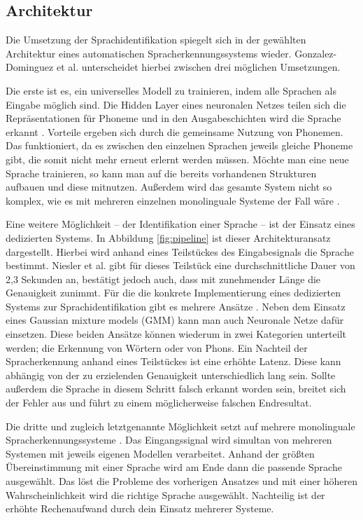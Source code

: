 \subsection{Architektur}
Die Umsetzung der Sprachidentifikation spiegelt sich in der gewählten Architektur eines automatischen Spracherkennungssystems wieder. Gonzalez-Dominguez et al. \cite{Gonzalez.2015} unterscheidet hierbei zwischen drei möglichen Umsetzungen.

Die erste ist es, ein universelles Modell zu trainieren, indem alle Sprachen als Eingabe möglich sind. Die Hidden Layer eines neuronalen Netzes teilen sich die Repräsentationen für Phoneme und in den Ausgabeschichten wird die Sprache erkannt \cite{Yu.2014}.
Vorteile ergeben sich durch die gemeinsame Nutzung von Phonemen. Das funktioniert, da es zwischen den einzelnen Sprachen jeweils gleiche Phoneme gibt, die somit nicht mehr erneut erlernt werden müssen.
Möchte man eine neue Sprache trainieren, so kann man auf die bereits vorhandenen Strukturen aufbauen und diese mitnutzen.
Außerdem wird das gesamte System nicht so komplex, wie es mit mehreren einzelnen monolinguale Systeme der Fall wäre \cite{Bartz.2017}.

Eine weitere Möglichkeit – der Identifikation einer Sprache – ist der Einsatz eines dedizierten Systems. In Abbildung \ref{fig:pipeline} ist dieser Architekturansatz
dargestellt. Hierbei wird anhand eines Teilstückes des Eingabesignals die Sprache bestimmt. Niesler et al. \cite{Niesler.2006} gibt für dieses Teilstück eine durchschnittliche Dauer von 2,3 Sekunden an,
bestätigt jedoch auch, dass mit zunehmender Länge die Genauigkeit zunimmt.
Für die die konkrete Implementierung eines dedizierten Systems zur Sprachidentifikation gibt es mehrere Ansätze \cite{Niesler.2006}. Neben dem Einsatz eines Gaussian mixture models (GMM) kann man auch Neuronale Netze dafür einsetzen.
Diese beiden Ansätze können wiederum in zwei Kategorien unterteilt werden; die Erkennung von Wörtern oder von Phons.
Ein Nachteil der Spracherkennung anhand eines Teilstückes ist eine erhöhte Latenz. Diese kann abhängig von der zu erzielenden Genauigkeit unterschiedlich lang sein.
Sollte außerdem die Sprache in diesem Schritt falsch erkannt worden sein,
breitet sich der Fehler aus und führt zu einem möglicherweise falschen Endresultat.

Die dritte und zugleich letztgenannte Möglichkeit setzt auf mehrere monolinguale Spracherkennungssysteme \cite{Gonzalez.2015}.
Das Eingangssignal wird simultan von mehreren Systemen mit jeweils eigenen Modellen verarbeitet.
Anhand der größten Übereinstimmung mit einer Sprache wird am Ende dann die passende Sprache ausgewählt.
Das löst die Probleme des vorherigen Ansatzes und mit einer höheren Wahrscheinlichkeit wird die richtige Sprache ausgewählt.
Nachteilig ist der erhöhte Rechenaufwand durch dein Einsatz mehrerer Systeme.


